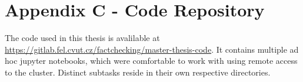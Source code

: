 \chapter*{Appendix C - Code Repository}

The code used in this thesis is avalilable at \url{https://gitlab.fel.cvut.cz/factchecking/master-thesis-code}. It contains multiple ad hoc jupyter notebooks, which were comfortable to work with using remote access to the cluster. Distinct subtasks reside in their own respective directories.